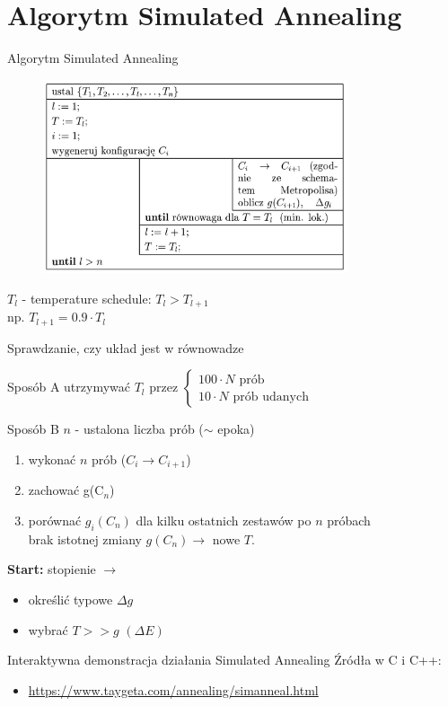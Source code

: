\section{Algorytm Simulated Annealing}

	
	\begin{frame}{Algorytm Simulated Annealing}
		\begin{figure}
			\includegraphics[width=0.8\textwidth]{img/18/sa_algorithm}
		\end{figure}
		$T_l$ - temperature schedule: $T_l > T_{l+1}$\\
		np. $T_{l+1} = 0.9 \cdot T_l$
	\end{frame}

	\begin{frame}{Sprawdzanie, czy układ jest w równowadze}
		\begin{block}{Sposób A}
			utrzymywać $T_l$ przez $\begin{cases}
			100 \cdot N \text{ prób} \\
			10 \cdot N \text{ prób udanych}
			\end{cases}$
		\end{block}
		
		\begin{block}{Sposób B}
		$n$ - ustalona liczba prób ($\sim$ epoka)
		\begin{enumerate}
			\item wykonać $n$ prób ($C_i \rightarrow C_{i+1}$)
			\item zachować g(C$_n$)
			\item porównać $g_i(C_n)$ dla kilku ostatnich zestawów po $n$ próbach \\
			brak istotnej zmiany $g(C_n) \rightarrow$ nowe $T$.
		\end{enumerate}
		\end{block}
		\textbf{Start:} stopienie $\rightarrow$ 
		\begin{itemize}
			\item określić typowe $\Delta g$
			\item wybrać $T >> g$ $(\Delta E)$
		\end{itemize}
		
		
	\end{frame}
	
	\begin{frame}{Interaktywna demonstracja działania Simulated Annealing}
		Źródła w C i C++:
		\begin{itemize}
			\item 	\url{https://www.taygeta.com/annealing/simanneal.html}
		\end{itemize}
		
		
	\end{frame}